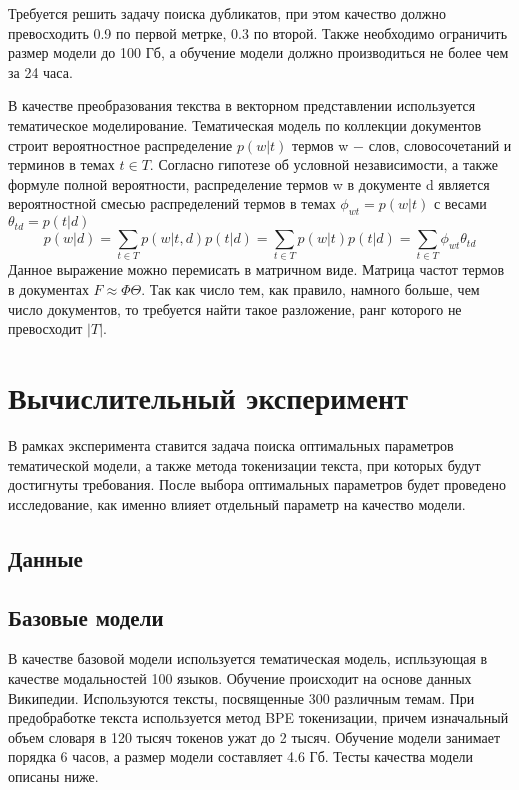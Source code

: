 \documentclass[12pt, twoside]{article}
\begin{document}
Требуется решить задачу поиска дубликатов, при этом качество должно превосходить 0.9 по первой метрке, 0.3 по второй. Также необходимо ограничить размер модели до 100 Гб, а обучение модели должно производиться не более чем за 24 часа.

В качестве преобразования текства в векторном представлении используется тематическое моделирование. Тематическая модель \cite{basetematic}  по коллекции документов строит вероятностное распределение $p(w|t)$ термов w $-$ слов, словосочетаний и терминов в темах $t \in T$. Согласно гипотезе об условной независимости, а также формуле полной вероятности, распределение термов w в документе d является вероятностной смесью распределений термов в темах $\phi_{wt} = p(w|t)$ с весами $\theta_{td}=p(t|d)$ $$p(w|d) = \sum_{t \in T} p(w|t, d)p(t|d) = \sum_{t \in T} p(w|t)p(t|d) =\sum_{t\in T}\phi_{wt}\theta_{td}$$
Данное выражение можно перемисать в матричном виде. Матрица частот термов в документах $F \approx \Phi \Theta$. Так как число тем, как правило, намного больше, чем число документов, то требуется найти такое разложение, ранг которого не превосходит $|T|$.


\section{Вычислительный эксперимент}

В рамках эксперимента ставится задача поиска оптимальных параметров тематической модели, а также метода токенизации текста, при которых будут достигнуты требования. После выбора оптимальных параметров будет проведено исследование, как именно влияет отдельный параметр на качество модели.

\subsection{Данные}

\subsection{Базовые модели}

В качестве базовой модели используется тематическая модель, испльзующая в качестве модальностей 100 языков. Обучение происходит на основе данных Википедии. Используются тексты, посвященные 300 различным темам. При предобработке текста используется метод BPE токенизации, причем изначальный объем словаря в 120 тысяч токенов ужат до 2 тысяч. Обучение модели занимает порядка 6 часов, а размер модели составляет 4.6 Гб. Тесты качества модели описаны ниже.
\end{document}

